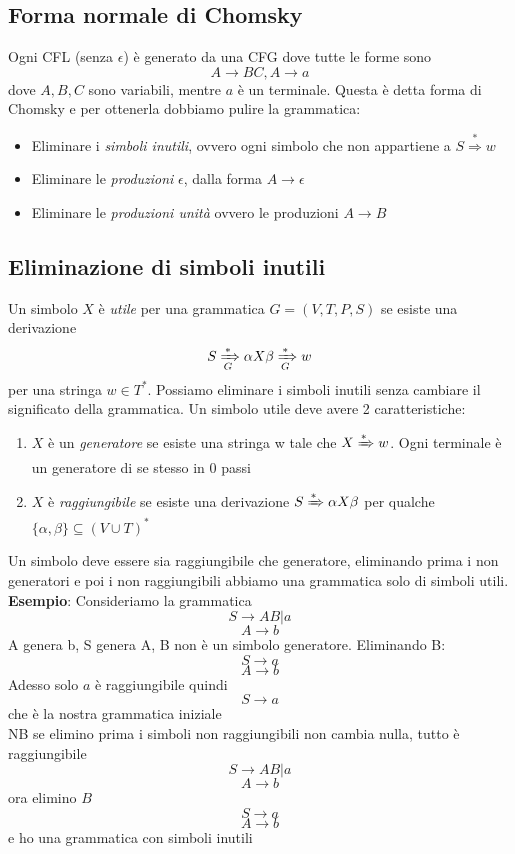 \documentclass[12pt]{article}
\begin{document}
\subsection{Forma normale di Chomsky}
Ogni CFL (senza $\epsilon$) è generato da una CFG dove tutte le forme sono 
\[A \rightarrow BC, A \rightarrow a\]
dove $A,B,C$ sono variabili, mentre $a$ è un terminale. Questa è detta forma di Chomsky e per ottenerla dobbiamo pulire la grammatica: 
\begin{itemize}
  \item Eliminare i \emph{simboli inutili}, ovvero ogni simbolo che non appartiene a $S \overset{*}\Rightarrow w$
  \item Eliminare le \emph{produzioni} $\epsilon$, dalla forma $A \rightarrow \epsilon$
  \item Eliminare le \emph{produzioni unità} ovvero le produzioni $A \rightarrow B$
\end{itemize}

\subsection{Eliminazione di simboli inutili} 
Un simbolo $X$ è \emph{utile} per una grammatica $G=(V,T,P,S)$ se esiste una derivazione 
\[ S \xRightarrow[G]{*} \alpha X \beta \xRightarrow[G]{*} w\]
per una stringa $w \in T^*$. Possiamo eliminare i simboli inutili senza cambiare il significato della grammatica. Un simbolo utile deve avere 2 caratteristiche: 
\begin{enumerate}
  \item $X$ è un \emph{generatore} se esiste una stringa w tale che $X \xRightarrow[]{*} w$. Ogni terminale è un generatore di se stesso in 0 passi
  \item $X$ è \emph{raggiungibile} se esiste una derivazione $S \xRightarrow[]{*} \alpha X \beta$ per qualche $\{\alpha, \beta\} \subseteq (V \cup T)^*$
\end{enumerate}
Un simbolo deve essere sia raggiungibile che generatore, eliminando prima i non generatori e poi i non raggiungibili abbiamo una grammatica solo di simboli utili.
\\ \textbf{Esempio}: Consideriamo la grammatica 
\[ S \rightarrow AB | a \]
\[ A \rightarrow b \]
A genera b, S genera A, B non è un simbolo generatore. Eliminando B: 
\[ S \rightarrow a \]
\[ A \rightarrow b \]
Adesso solo $a$ è raggiungibile quindi 
\[ S \rightarrow a \]
che è la nostra grammatica iniziale
\\ 
NB se elimino prima i simboli non raggiungibili non cambia nulla, tutto è raggiungibile
\[ S \rightarrow AB | a \]
\[ A \rightarrow b \]
ora elimino $B$ 
\[ S \rightarrow a \]
\[ A \rightarrow b \]
e ho una grammatica con simboli inutili
\end{document}
